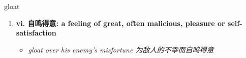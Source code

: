 
\begin{frame}
{\huge gloat}
\begin{center}
\begin{enumerate}\Large
  \item \textbf{vi. 自鸣得意: a feeling of great, often malicious, pleasure or self-satisfaction}
  \begin{itemize}
    \item \em{\Large{gloat over his enemy's misfortune 为敌人的不幸而自鸣得意}}
  \end{itemize}
\end{enumerate}
\end{center}
\end{frame}
